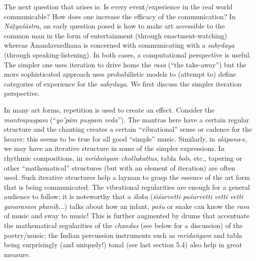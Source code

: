 The next question that arises is: Is every event/experience in the real world communicable? How does one increase the efficacy of the communication? In \textsl{Nāṭyaśāstra}, an early question posed is how to make art accessible to the common man in the form of entertainment (through enactment-watching) whereas Ānandavardhana is concerned with communicating with a \textsl{sahṛdaya} (through speaking-listening). In both cases, a computational perspective is useful. The simpler one uses iteration to drive home the \textsl{rasa} (“the take-away”) but the more sophisticated approach uses probabilistic models to (attempt to) define categories of experience for the \textsl{sahṛdaya}. We first discuss the simpler iteration perspective. 

In many art forms, repetition is used to create an effect. Consider the \textsl{mantrapuṣpam} (“\textsl{yo’pām puṣpam veda}”). The mantras here have a certain regular structure and the chanting creates a certain “vibrational” sense or cadence for the hearer; this seems to be true for all good “simple” music. Similarly, in \textsl{alāpana}-s, we may have an iterative structure in some of the simpler expressions. In rhythmic compositions, in \textsl{mridaṅgam} \textsl{chollukattus}, tabla \textsl{bols}, etc., tapering or other “mathematical” structures (but with an element of iteration) are often used. Such iterative structures help a layman to grasp the essence of the art form that is being communicated. The vibrational regularities are enough for a general audience to follow; it is noteworthy that a \textsl{śloka} (\textsl{śiśurvetti paśurvetti vetti vetti ganarasam phaniḥ}...) talks about how an infant, \textsl{paśu} or snake can know the \textsl{rasa} of music and sway to music! This is further augmented by drums that accentuate the mathematical regularities of the \textsl{chandas} (see below for a discussion) of the poetry/music; the Indian percussion instruments such as \textsl{mridaṅgam} and tabla being surprisingly (and uniquely!) tonal (see last section 5.4) also help in great measure. 

